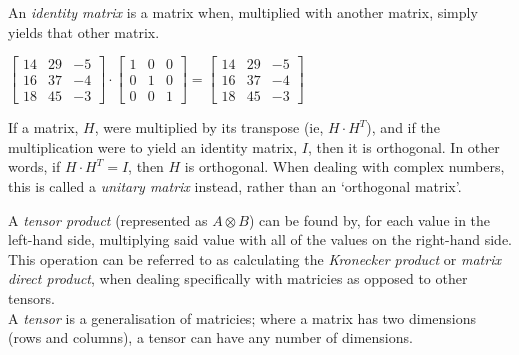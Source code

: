 \begin{definition}
    An \emph{identity matrix} is a matrix when, multiplied with another matrix, simply yields that other matrix.
\end{definition}

\begin{example}
    $
    \begin{bmatrix}
        14 & 29 & -5\\
        16 & 37 & -4\\
        18 & 45 & -3
    \end{bmatrix}
    \cdot
    \begin{bmatrix}
        1 & 0 & 0\\
        0 & 1 & 0\\
        0 & 0 & 1
    \end{bmatrix}
    =
    \begin{bmatrix}
        14 & 29 & -5\\
        16 & 37 & -4\\
        18 & 45 & -3
    \end{bmatrix}
    $
\end{example}

\begin{note}
    If a matrix, $H$, were multiplied by its transpose (ie, $H \cdot H^T$), and if the multiplication were to yield an identity matrix, $I$, then it is orthogonal. In other words, if $H \cdot H^T = I$, then $H$ is orthogonal. When dealing with complex numbers, this is called a \emph{unitary matrix} instead, rather than an `orthogonal matrix'.
\end{note}

\begin{definition}
    A \emph{tensor product} (represented as $A \otimes B$) can be found by, for each value in the left-hand side, multiplying said value with all of the values on the right-hand side. This operation can be referred to as calculating the \emph{Kronecker product} or \emph{matrix direct product}, when dealing specifically with matricies as opposed to other tensors.\\
    A \emph{tensor} is a generalisation of matricies; where a matrix has two dimensions (rows and columns), a tensor can have any number of dimensions.
\end{definition}

